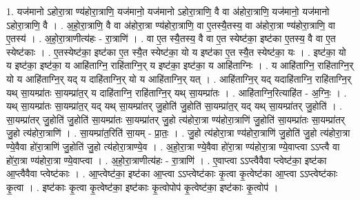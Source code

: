 \documentclass[17pt]{extarticle}
\begin{document}
1. यज॑मानो ऽहोरा॒त्रा ण्य॑होरा॒त्राणि॒ यज॑मानो॒ यज॑मानो ऽहोरा॒त्राणि॒ वै वा अ॑होरा॒त्राणि॒ यज॑मानो॒ यज॑मानो ऽहोरा॒त्राणि॒ वै । . अ॒हो॒रा॒त्राणि॒ वै वा अ॑होरा॒त्रा ण्य॑होरा॒त्राणि॒ वा ए॒तस्यै॒तस्य॒ वा अ॑होरा॒त्रा ण्य॑होरा॒त्राणि॒ वा ए॒तस्य॑ । . अ॒हो॒रा॒त्राणीत्य॑हः - रा॒त्राणि॑ । . वा ए॒त स्यै॒तस्य॒ वै वा ए॒त स्येष्ट॑का॒ इष्ट॑का ए॒तस्य॒ वै वा ए॒त स्येष्ट॑काः । . ए॒तस्येष्ट॑का॒ इष्ट॑का ए॒त स्यै॒त स्येष्ट॑का॒ यो य इष्ट॑का ए॒त स्यै॒त स्येष्ट॑का॒ यः । . इष्ट॑का॒ यो य इष्ट॑का॒ इष्ट॑का॒ य आहि॑ताग्नि॒ राहि॑ताग्नि॒र् य इष्ट॑का॒ इष्ट॑का॒ य आहि॑ताग्निः । . य आहि॑ताग्नि॒ राहि॑ताग्नि॒र् यो य आहि॑ताग्नि॒र् यद् य दाहि॑ताग्नि॒र् यो य आहि॑ताग्नि॒र् यत् । . आहि॑ताग्नि॒र् यद् यदाहि॑ताग्नि॒ राहि॑ताग्नि॒र् यथ् सा॒यम्प्रा॑तः सा॒यम्प्रा॑त॒र् य दाहि॑ताग्नि॒ राहि॑ताग्नि॒र् यथ् सा॒यम्प्रा॑तः । . आहि॑ताग्नि॒रित्याहि॑त - अ॒ग्निः॒ । . यथ् सा॒यम्प्रा॑तः सा॒यम्प्रा॑त॒र् यद् यथ् सा॒यम्प्रा॑तर् जु॒होति॑ जु॒होति॑ सा॒यम्प्रा॑त॒र् यद् यथ् सा॒यम्प्रा॑तर् जु॒होति॑ । . सा॒यम्प्रा॑तर् जु॒होति॑ जु॒होति॑ सा॒यम्प्रा॑तः सा॒यम्प्रा॑तर् जु॒हो त्य॑होरा॒त्रा ण्य॑होरा॒त्राणि॑ जु॒होति॑ सा॒यम्प्रा॑तः 
सा॒यम्प्रा॑तर् जु॒हो त्य॑होरा॒त्राणि॑ । . सा॒यम्प्रा॑त॒रिति॑ सा॒यम् - प्रा॒तः॒ । . जु॒हो त्य॑होरा॒त्रा ण्य॑होरा॒त्राणि॑ जु॒होति॑ जु॒हो त्य॑होरा॒त्रा ण्ये॒वैवा हो॑रा॒त्राणि॑ जु॒होति॑ जु॒हो त्य॑होरा॒त्राण्ये॒व । . अ॒हो॒रा॒त्रा ण्ये॒वैवा हो॑रा॒त्रा ण्य॑होरा॒त्रा ण्ये॒वाप्त्वा ऽऽप्त्वै वा हो॑रा॒त्रा ण्य॑होरा॒त्रा ण्ये॒वाप्त्वा । . अ॒हो॒रा॒त्राणीत्य॑हः - रा॒त्राणि॑ । . ए॒वाप्त्वा ऽऽप्त्वैवैवा प्त्वेष्ट॑का॒ इष्ट॑का आ॒प्त्वैवैवा प्त्वेष्ट॑काः । . आ॒प्त्वेष्ट॑का॒ इष्ट॑का आ॒प्त्वा ऽऽप्त्वेष्ट॑काः कृ॒त्वा कृ॒त्वेष्ट॑का आ॒प्त्वा ऽऽप्त्वेष्ट॑काः कृ॒त्वा । . इष्ट॑काः कृ॒त्वा कृ॒त्वेष्ट॑का॒ इष्ट॑काः कृ॒त्वोपोप॑ कृ॒त्वेष्ट॑का॒ इष्ट॑काः कृ॒त्वोप॑ । \newline
\end{document}

